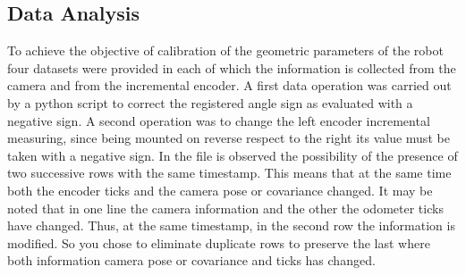 \subsection{Data Analysis}
To achieve the objective of calibration of the geometric parameters of the robot four datasets were provided in each of which the information is collected from the camera and from the incremental encoder.
A first data operation was carried out by a python script to correct the registered angle sign as evaluated with a negative sign.
A second operation was to change the left encoder incremental measuring, since being mounted on reverse respect to the right its value must be taken with a negative sign.
In the file is observed the possibility of the presence of two successive rows with the same timestamp. 
This means that at the same time both the encoder ticks and the camera pose or covariance changed.
It may be noted that in one line the camera information and the other the odometer ticks have changed. 
Thus, at the same timestamp, in the second row the information is modified.
So you chose to eliminate duplicate rows to preserve the last where both information camera pose or covariance and ticks has changed.